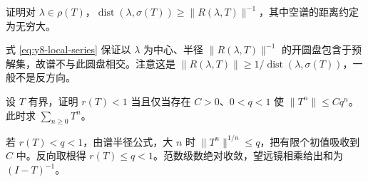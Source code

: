 \begin{exercise}[谱的下界控制]\label{ex:y8-distance}
证明对 $\lambda\in\rho(T)$，$\operatorname{dist}(\lambda,\sigma(T))\ge\|R(\lambda,T)\|^{-1}$，其中空谱的距离约定为无穷大。
\end{exercise}
\begin{solution}
式 \eqref{eq:y8-local-series} 保证以 $\lambda$ 为中心、半径 $\|R(\lambda,T)\|^{-1}$ 的开圆盘包含于预解集，故谱不与此圆盘相交。注意这是 $\|R(\lambda,T)\|\ge1/\operatorname{dist}(\lambda,\sigma(T))$，一般不是反方向。
\end{solution}

\begin{exercise}[幂趋零与谱半径]\label{ex:y8-powers}
设 $T$ 有界，证明 $r(T)<1$ 当且仅当存在 $C>0$、$0<q<1$ 使 $\|T^n\|\le Cq^n$。此时求 $\sum_{n\ge0}T^n$。
\end{exercise}
\begin{solution}
若 $r(T)<q<1$，由谱半径公式，大 $n$ 时 $\|T^n\|^{1/n}\le q$，把有限个初值吸收到 $C$ 中。反向取根得 $r(T)\le q<1$。范数级数绝对收敛，望远镜相乘给出和为 $(I-T)^{-1}$。
\end{solution}
